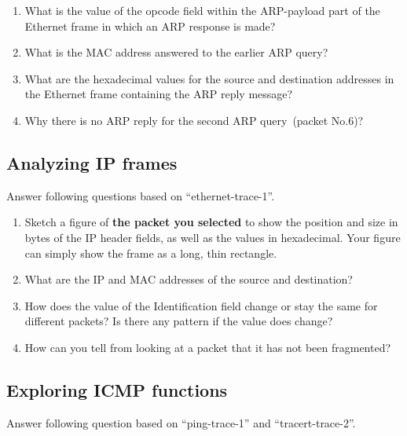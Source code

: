 \begin{enumerate}
\item What is the value of the opcode field within the ARP-payload part of the Ethernet frame in which an ARP response is made?
      
\item What is the MAC address answered to the earlier ARP query?
      
\item What are the hexadecimal values for the source and destination addresses in the Ethernet frame containing the ARP reply message?
  
\item Why there is no ARP reply for the second ARP query~(packet No.6)?
\end{enumerate}

\subsection{Analyzing IP frames}\label{Dis_IP}
Answer following questions based on ``ethernet-trace-1''.
\begin{enumerate}

\item Sketch a figure of \textbf{the packet you selected} to show the position and size in bytes of the IP header fields, as well as the values in hexadecimal. Your figure can simply show the frame as a long, thin rectangle. 
	
\item What are the IP and MAC addresses of the source and destination?
	
\item How does the value of the Identification field change or stay the same for different packets? Is there any pattern if the value does change?	
	
\item How can you tell from looking at a packet that it has not been fragmented? 
\end{enumerate}

\subsection{Exploring ICMP functions}\label{Dis_ICMP}
Answer following question based on ``ping-trace-1'' and ``tracert-trace-2''.

